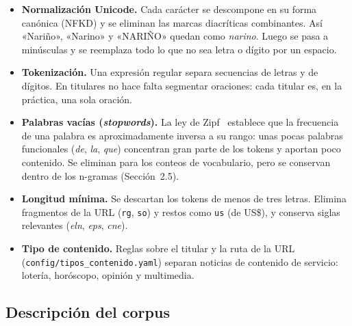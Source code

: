 \documentclass[10pt,twocolumn]{article}
\begin{document}
\begin{itemize}
\item \textbf{Normalización Unicode.} Cada carácter se descompone en su forma
canónica (NFKD) y se eliminan las marcas diacríticas combinantes. Así
«Nariño», «Narino» y «NARIÑO» quedan como \textit{narino}. Luego se pasa a
minúsculas y se reemplaza todo lo que no sea letra o dígito por un espacio.
\item \textbf{Tokenización.} Una expresión regular separa secuencias de letras
y de dígitos. En titulares no hace falta segmentar oraciones: cada titular es,
en la práctica, una sola oración.
\item \textbf{Palabras vacías (\textit{stopwords}).} La ley de
Zipf~\cite{zipf1949} establece que la frecuencia de una palabra es
aproximadamente inversa a su rango: unas pocas palabras funcionales
(\textit{de}, \textit{la}, \textit{que}) concentran gran parte de los tokens
y aportan poco contenido. Se eliminan para los conteos de vocabulario, pero
se conservan dentro de los n-gramas (Sección~2.5).
\item \textbf{Longitud mínima.} Se descartan los tokens de menos de tres
letras. Elimina fragmentos de la URL (\texttt{rg}, \texttt{so}) y restos como
\texttt{us} (de US\$), y conserva siglas relevantes (\textit{eln},
\textit{eps}, \textit{cne}).
\item \textbf{Tipo de contenido.} Reglas sobre el titular y la ruta de la URL
(\texttt{config/tipos\_contenido.yaml}) separan noticias de contenido de
servicio: lotería, horóscopo, opinión y multimedia.
\end{itemize}

\subsection{Descripción del corpus}
\end{document}
